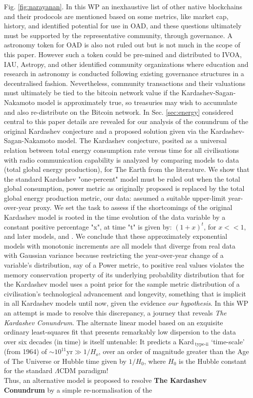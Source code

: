 \documentclass[final,5p,times,twocolumn,authoryear]{elsarticle}
\begin{document}
Fig. \ref{fig:narayanan}. In this WP an inexhaustive list of other native blockchains and their prodocols are mentioned based on some metrics, like market cap, history, and identified potential for use in OAD, and these questions ultimately must be supported by the representative community, through governance. A astronomy token for OAD is also not ruled out but is not much in the scope of this paper. However such a token could be pre-mined and distributed to IVOA, IAU, Astropy, and other identified community organizations where education and research in astronomy is conducted following existing governance structures in a decentralised fashion. Nevertheless, community transactions and their valuations must ultimately be tied to the bitcoin network value if the Kardashev-Sagan-Nakamoto model is approximately true, so treasuries may wish to accumulate and also re-distribute on the Bitcoin network. In Sec. \ref{sec:energy} considered central to this paper details are revealed for our analysis of the conundrum of the original Kardashev conjecture and a proposed solution given via the Kardashev-Sagan-Nakamoto model. The Kardashev conjecture, posited as a universal relation between total energy consumption rate versus time for all civilisations with radio communication capability is analyzed by comparing models to data (total global energy production), for The Earth from the literature. We show that the standard Kardashev "one-percent" model must be ruled out when the total global consumption, power metric as originally proposed is replaced by the total global energy production metric, our data: assumed a suitable upper-limit year-over-year proxy. We set the task to assess if the shortcomings of the original Kardashev model is rooted in the time evolution of the data variable by a constant positive percentage "x", at time "t" is given by: $(1+x)^{t}$, for $x<< 1$,  \cite{kar64} and later models,\citep[eg.,][]{sagan73} and \cite{gray2020}. We conclude that these approximately exponential models with monotonic increments are all models that diverge from real data with Gaussian variance because restricting the year-over-year change of a variable's distribution, say of a Power metric, to positive real values violates the memory conservation property of its underlying probability distribution that for the Kardashev model uses a point prior for the sample metric distribution of a civilisation's technological advancement and longevity, something that is implicit in all Kardashev models until now, given the evidence \textit{our hypothesis}. In this WP an attempt is made to resolve this discrepancy, a journey that reveals \textit{The Kardashev Conundrum}. The alternate linear model based on an exquisite ordinary least-squares fit that presents remarkably low dispersion to the data over six decades (in time) is itself untenable: It predicts a Kard$\,_{\textrm{type-ii}}$ `time-scale' (from 1964) of $\sim 10^{11} \textrm{yr} \gg {1/H_o}$, over an order of magnitude greater than the Age of The Universe or Hubble time given by $1/H{_0}$, where $H_{0}$ is the Hubble constant for the standard $\Lambda$CDM paradigm!\\ Thus, an alternative model is proposed to resolve \textbf{ The Kardashev Conundrum} by a simple re-normalisation of the 
\end{document}
